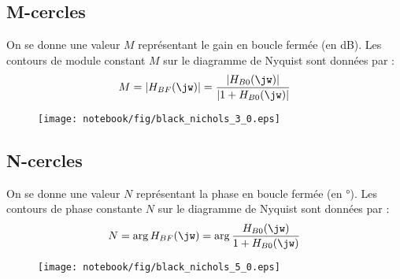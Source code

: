 \subsection{M-cercles}
On se donne une valeur $M$ représentant le gain en boucle fermée (en \si{\dB}). 
Les contours de module constant $M$ sur le diagramme de Nyquist 
sont données par :
\[
    M=|H_{BF}(\jw)|=\dfrac{|H_{B0}(\jw)|}{|1+H_{B0}(\jw)|}
\]
\begin{figure}[!h]
\begin{center}
    \texttt{[image: notebook/fig/black\_nichols\_3\_0.eps]}
\end{center}
\end{figure}
\subsection{N-cercles}
On se donne une valeur $N$ représentant la phase en boucle fermée 
(en \si{\degree}). Les contours de phase constante $N$ sur le diagramme 
de Nyquist sont données par :
\[
    N=\arg{H_{BF}(\jw)}=\arg{\dfrac{H_{B0}(\jw)}{1+H_{B0}(\jw)}}
\]
\begin{figure}[!h]
    \begin{center}
        \texttt{[image: notebook/fig/black\_nichols\_5\_0.eps]}
    \end{center}
\end{figure}
\clearpage

